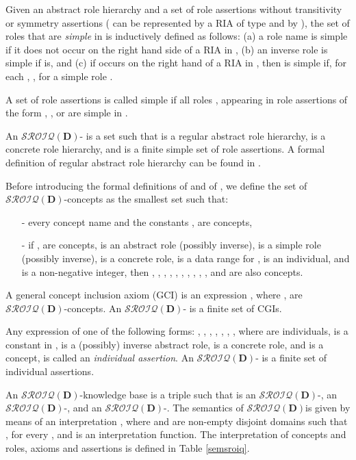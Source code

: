 \documentclass[a4paper]{llncs}
\newcommand{\sroiqd}{\ensuremath{\mathcal{SROIQ}(\D)}}
\newcommand{\D}{\mathbf{D}}
\begin{document}
Given an abstract role hierarchy  and a set of role assertions  without transitivity or symmetry assertions ( can be represented by a RIA of type  and  by ), the set of roles that are \emph{simple} in  is inductively defined as follows: (a)
a role name is simple if it does not occur on the right hand side of a RIA in ,
(b) an inverse role  is simple if  is, and
(c) if  occurs on the right hand of a RIA in , then  is simple if, for each ,  , for a simple role .


A set of role assertions  is called simple if all roles ,  appearing in role assertions of the form , , or  are simple in .





An \sroiqd- is a set  such that  is a regular abstract role hierarchy,  is a concrete role hierarchy, and  is a finite simple set of role assertions. A formal definition of regular abstract role hierarchy can be found in \cite{Horrocks2006}.

Before introducing the formal definitions of  and of , we define the set of \sroiqd-concepts as the smallest set such that:
\begin{itemize}
\item[-]{every concept name and the constants ,  are concepts,}
\item[-]{if ,  are concepts,  is an abstract role (possibly inverse),  is a simple role (possibly inverse),  is a concrete role,  is a data range for ,  is an individual, and  is a non-negative integer, then , , , , , , , , , , and  are also concepts.}
\end{itemize}

A general concept inclusion axiom (GCI) is an expression , where ,  are \sroiqd-concepts. An \sroiqd-  is a finite set of CGIs.

Any expression of one of the following forms: , , , , , , , where  are individuals,  is a constant in ,  is a (possibly) inverse abstract role,  is a concrete role, and  is a concept, is called an \emph{individual assertion}. An \sroiqd-  is a finite set of individual assertions.

An \sroiqd-knowledge base is a triple  such that  is an \sroiqd-,  an \sroiqd-, and  an \sroiqd-.
The semantics of \sroiqd\space is given by means of an interpretation , where  and  are non-empty disjoint domains such that , for every , and
 is an interpretation function.
The interpretation of concepts and roles, axioms and assertions is defined in Table \ref{semsroiq}.
\end{document}
